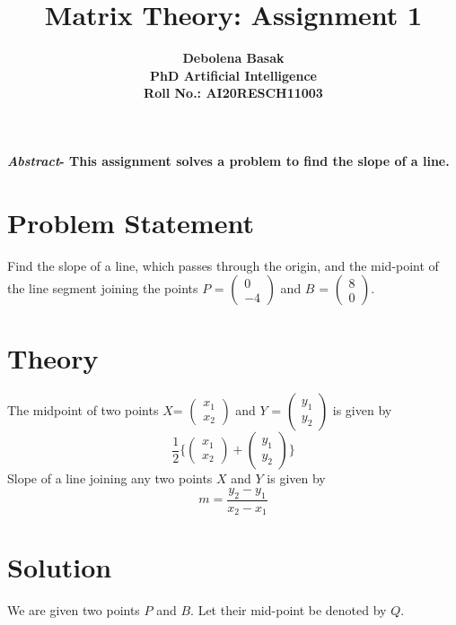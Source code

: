 \documentclass{article}
\title{\textbf{Matrix Theory: Assignment 1}}
\author{\textbf{Debolena Basak}\\
\textbf{PhD Artificial Intelligence}\\
\textbf{Roll No.: AI20RESCH11003}}
\date{}
\begin{document}
\maketitle

\textbf{\emph{Abstract}- This assignment solves a problem to find the slope of a line.}

\section{Problem Statement}
Find the slope of a line, which passes through
the origin, and the mid-point of the line segment
joining the points $P$ =
$
\left(\begin{array}{c}
    0\\
    -4
\end{array}\right)
$ and $B$ =
$
\left(\begin{array}{c}
    8\\
    0
\end{array}\right)
$.

\section{Theory}
The midpoint of two points $X$=
$
\left(\begin{array}{c}
    x_{1}\\
    x_{2}
\end{array}\right)
$ and $Y$ =
$
\left(\begin{array}{c}
    y_{1}\\
    y_{2}
\end{array}\right)
$ 
is given by
\begin{equation}
    \frac{1}{2}
\Bigg\{
\left(\begin{array}{c}
    x_{1}\\
    x_{2}
\end{array}\right)
 +
\left(\begin{array}{c}
    y_{1}\\
    y_{2}
\end{array}\right)
\Bigg\}
\end{equation}
Slope of a line joining any two points $X$ and $Y$ is given by 
\begin{equation}
    m=\frac{y_{2}-y_{1}}{x_{2}-x_{1}}
\end{equation}

\section{Solution}
We are given two points $P$ and $B$. Let their mid-point be denoted by $Q$.
\end{document}
